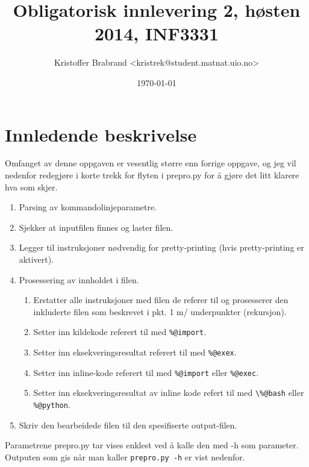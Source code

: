 \documentclass{article}
\title{Obligatorisk innlevering 2, høsten 2014, INF3331}
\author{Kristoffer Brabrand <kristrek@student.matnat.uio.no>}
\date{\today}
\begin{document}
\maketitle

\section*{Innledende beskrivelse}

Omfanget av denne oppgaven er vesentlig større enn forrige oppgave, og jeg vil nedenfor redegjøre i korte trekk for flyten i prepro.py for å gjøre det litt klarere hva som skjer.

\begin{enumerate}
  \item Parsing av kommandolinjeparametre.
  \item Sjekker at inputfilen finnes og laster filen.
  \item Legger til instruksjoner nødvendig for pretty-printing (hvis pretty-printing er aktivert).
  \item Prosessering av innholdet i filen.
  \begin{enumerate}
  	\item Erstatter alle \-instruksjoner med filen de referer til og prosesserer den inkluderte filen som beskrevet i pkt. 1 m/ underpunkter (rekursjon).
  	\item Setter inn kildekode referert til med \verb;%@import;.
  	\item Setter inn eksekveringsresultat referert til med \verb;%@exex;.
  	\item Setter inn inline-kode referert til med \verb;%@import; eller \verb;%@exec;.
  	\item Setter inn eksekveringsresultat av inline kode refert til med \verb;\%@bash; eller \verb;%@python;.
  \end{enumerate}
  \item Skriv den bearbeidede filen til den spesifiserte output-filen.
\end{enumerate}

Parametrene prepro.py tar vises enklest ved å kalle den med -h som parameter. Outputen som gis når man kaller \verb;prepro.py -h; er vist nedenfor.





















\end{document}
